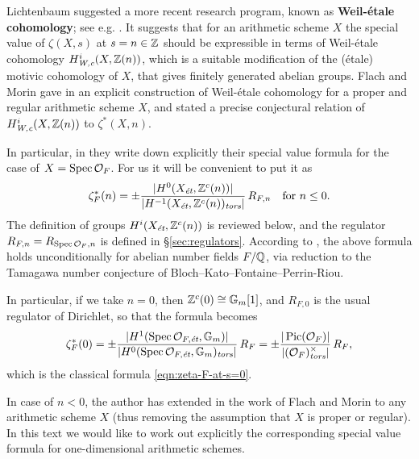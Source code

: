 \documentclass{article}
\numberwithin{equation}{section}
\begin{document}
\vspace{1em}

Lichtenbaum suggested a more recent research program, known as
\textbf{Weil-étale cohomology}; see e.g.
\cite{Lichtenbaum-2005,Lichtenbaum-2009-number-rings,Lichtenbaum-2009-Euler-char}.
It suggests that for an arithmetic scheme $X$ the special value of $\zeta (X,s)$
at $s = n \in \ZZ$ should be expressible in terms of Weil-étale cohomology
$H^i_\Wc (X,\ZZ(n))$, which is a suitable modification of the (étale) motivic
cohomology of $X$, that gives finitely generated abelian groups. Flach and Morin
gave in \cite{Flach-Morin-2018} an explicit construction of Weil-étale
cohomology for a proper and regular arithmetic scheme $X$, and stated a precise
conjectural relation of $H^i_\Wc (X,\ZZ(n))$ to $\zeta^* (X,n)$.

In particular, in \cite[\S 5.8.3]{Flach-Morin-2018} they write down explicitly
their special value formula for the case of $X = \Spec \mathcal{O}_F$. For us it
will be convenient to put it as
\begin{equation}
  \label{eqn:flach-morin-zeta-F-formula}
  \zeta_F^* (n) = \pm\frac{|H^0 (X_\et, \ZZ^c (n))|}{|H^{-1} (X_\et, \ZZ^c (n))_\tors|}\,R_{F,n}
  \quad \text{for }n \le 0.
\end{equation}
The definition of groups $H^i (X_\et, \ZZ^c (n))$ is reviewed below, and the
regulator $R_{F,n} = R_{\Spec \mathcal{O}_F,n}$ is defined in
\S\ref{sec:regulators}. According to \cite[Proposition~5.35]{Flach-Morin-2018},
the above formula holds unconditionally for abelian number fields $F/\QQ$, via
reduction to the Tamagawa number conjecture of
Bloch--Kato--Fontaine--Perrin-Riou.

In particular, if we take $n = 0$, then $\ZZ^c (0) \cong \mathbb{G}_m [1]$, and
$R_{F,0}$ is the usual regulator of Dirichlet, so that the formula becomes
\[ \zeta_F^* (0) =
  \pm \frac{|H^1 (\Spec \mathcal{O}_{F,\et}, \mathbb{G}_m)|}{|H^0 (\Spec \mathcal{O}_{F,\et}, \mathbb{G}_m)_\tors|}\,R_F =
  \pm \frac{|\Pic (\mathcal{O}_F)|}{|(\mathcal{O}_F)^\times_\tors|}\,R_F, \]
which is the classical formula \eqref{eqn:zeta-F-at-s=0}.

In case of $n < 0$, the author has extended in
\cite{Beshenov-Weil-etale-1,Beshenov-Weil-etale-2} the work of Flach and Morin
to any arithmetic scheme $X$ (thus removing the assumption that $X$ is proper or
regular). In this text we would like to work out explicitly the corresponding
special value formula for one-dimensional arithmetic schemes.
\end{document}
